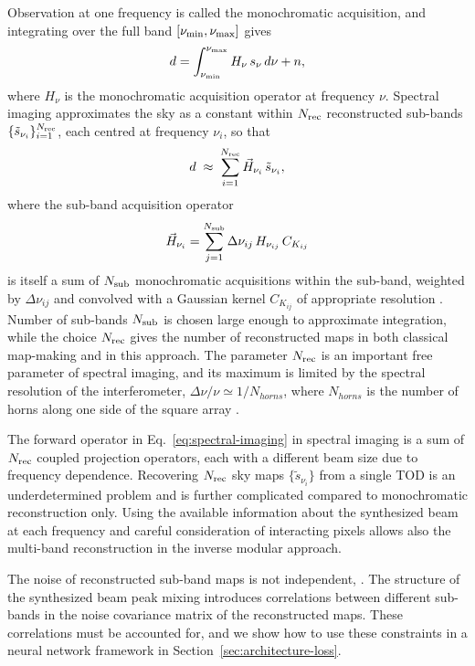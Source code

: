 \documentclass[a4paper,11pt]{article}
\begin{document}
Observation at one frequency is called the monochromatic acquisition, and integrating  over the full band $[\nu_{\rm min}, \nu_{\rm max}]$ gives
\begin{equation}
    d = \int_{\nu_{\rm min}}^{\nu_{\rm max}}
    H_\nu\,s_\nu\,d\nu + n,
    \label{eq:polychromatic}
\end{equation}
where $H_\nu$ is the monochromatic acquisition operator at frequency $\nu$. Spectral imaging approximates the sky as a constant within $N_{\rm rec}$ reconstructed sub-bands
$\{\tilde{s}_{\nu_i}\}_{i=1}^{N_{\rm rec}}$, each centred at frequency $\nu_i$, so that
\begin{equation}
    d \;\approx\; \sum_{i=1}^{N_{\rm rec}} \vec{H}_{\nu_i}\,
    \tilde{s}_{\nu_i},
    \label{eq:spectral-imaging}
\end{equation}
where the sub-band acquisition operator
\begin{equation}
    \vec{H}_{\nu_i} = \sum_{j=1}^{N_{\rm sub}}
    \Delta\nu_{ij}\,H_{\nu_{ij}}\,C_{K_{ij}}
    \label{eq:subband-operator}
\end{equation}
is itself a sum of $N_{\rm sub}$ monochromatic acquisitions within the
sub-band, weighted by $\Delta\nu_{ij}$ and convolved with a Gaussian
kernel $C_{K_{ij}}$ of appropriate resolution \cite{mousset2022qubic2, regnier2024spectral}. Number of sub-bands $N_{\rm sub}$ is chosen large enough to approximate integration, while the choice $N_{\rm rec}$ gives the number of reconstructed maps in both classical map-making and in this approach. The parameter $N_{\rm rec}$ is an important free parameter of spectral imaging, and its maximum is limited by the spectral
resolution of the interferometer, $\Delta\nu/\nu \simeq 1/N_{horns}$, where $N_{horns}$ is the number of horns along one side of the square array \cite{mousset2022qubic2}. 

The forward operator in Eq.~\ref{eq:spectral-imaging} in spectral imaging is a sum of $N_{\rm rec}$ coupled
projection operators, each with a different beam size due to frequency dependence. Recovering $N_{\rm rec}$ sky maps $\{\tilde{s}_{\nu_i}\}$ from a single TOD is an underdetermined problem and is further complicated compared to monochromatic reconstruction only. Using the available information about the synthesized beam at each frequency and careful consideration of interacting pixels allows also the multi-band reconstruction in the inverse modular approach.

The noise of reconstructed sub-band maps is not independent, \cite{regnier2024spectral, mousset2022qubic2}. The structure of the synthesized beam peak mixing introduces correlations between different sub-bands in the noise covariance matrix of the reconstructed maps. These correlations must be accounted for, and we show how to use these constraints in a neural network framework in Section~\ref{sec:architecture-loss}.
\end{document}
